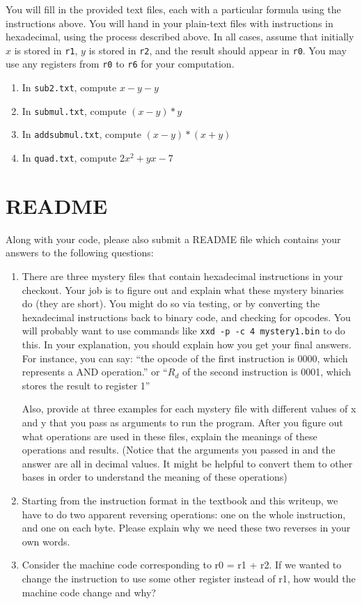 \documentclass{article}
\def\r#1{\texttt{r#1}}
\begin{document}
You will fill in the provided text files, each with a particular formula using
the instructions above. You will hand in your plain-text files with
instructions in hexadecimal, using the process described above. In all cases,
assume that initially $x$ is stored in \r{1}, $y$ is stored in \r{2}, and the
result should appear in \r{0}. You may use any registers from \r{0} to \r{6}
for your computation.

\begin{enumerate}
\item In {\tt sub2.txt}, compute $x - y - y$
\item In {\tt submul.txt}, compute $(x - y) * y$
\item In {\tt addsubmul.txt}, compute $(x - y) * (x + y)$
\item In {\tt quad.txt}, compute $2x^2 + yx - 7$
\end{enumerate}


\section{README}

Along with your code, please also submit a README file which contains your 
answers to the following questions:

\begin{enumerate} \item There are three mystery files that contain hexadecimal
instructions in your checkout. Your job is to figure out and explain what these
mystery binaries do (they are short). You might do so via testing, or by
converting the hexadecimal instructions back to binary code, and checking for
opcodes. You will probably want to use commands like {\tt xxd -p -c 4
mystery1.bin} to do this. In your explanation, you should explain how you get
your final answers. For instance, you can say: ``the opcode of the first
instruction is 0000, which represents a AND operation.'' or ``$R_d$ of the
second instruction is 0001, which stores the result to register 1'' 

Also, provide at three examples for each mystery file with different values of
x and y that you pass as arguments to run the program. After you figure out
what operations are used in these files, explain the meanings of these
operations and results. (Notice that the arguments you passed in and the answer
are all in decimal values. It might be helpful to convert them to other bases
in order to understand the meaning of these operations)

\item Starting from the instruction format in the textbook and this writeup, 
we have to do two apparent reversing operations: one on the whole instruction, 
and one on each byte. Please explain why we need these two reverses in your
own words.
\item Consider the machine code corresponding to r0 = r1 + r2. If we wanted to 
change the instruction to use some other register instead of r1, how would the 
machine code change and why?
\end{enumerate}
\end{document}
